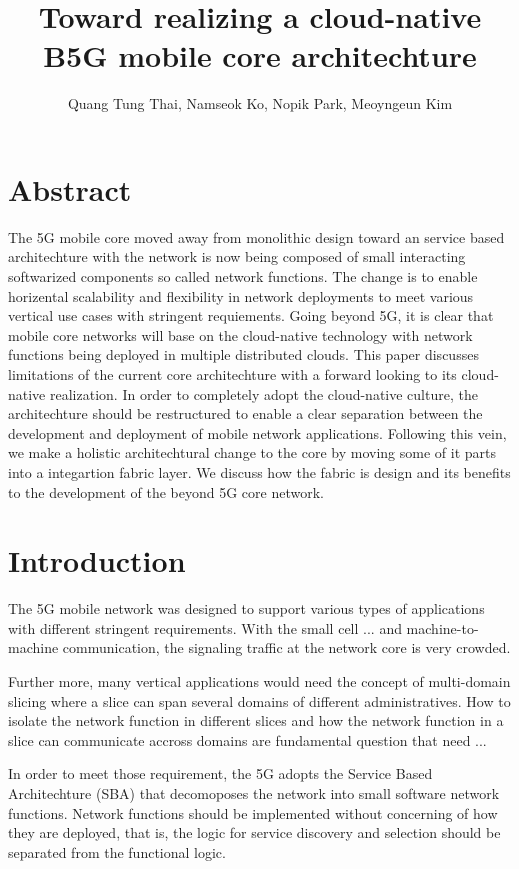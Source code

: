\documentclass[a4paper]{article}
\author{Quang Tung Thai, Namseok Ko, Nopik Park, Meoyngeun Kim}
\title{Toward realizing a cloud-native B5G mobile core architechture}
\begin{document}
\maketitle

\section{Abstract}

The 5G mobile core moved away from monolithic design toward an service based architechture with the network is now being composed of small interacting softwarized components so called network functions. The change is to enable horizental scalability and flexibility in network deployments to meet various vertical use cases with stringent requiements. Going beyond 5G, it is clear that mobile core networks will base on the cloud-native technology with network functions being deployed in multiple distributed clouds. This paper discusses limitations of the current core architechture with a forward looking to its cloud-native realization. In order to completely adopt the cloud-native culture, the architechture should be restructured to enable a clear separation between the development and deployment of mobile network applications.  Following this vein, we make a holistic architechtural change to the core by moving some of it parts into a integartion fabric layer. We discuss how the fabric is design and its benefits to the development of the beyond 5G core network.



\section{Introduction}

The 5G mobile network was designed to support various types of applications with different stringent requirements.  With the small cell ... and machine-to-machine communication, the signaling traffic at the network core is very crowded. 

Further more, many vertical applications would need the concept of multi-domain slicing where a slice can span several domains of different administratives. How to isolate the network function in different slices and how the network function in a slice can communicate accross domains are fundamental question that need ...

In order to meet those requirement, the 5G adopts the Service Based Architechture (SBA) that decomoposes the network into small software network functions. 
Network functions should be implemented without concerning of how they are deployed, that is, the logic for service discovery and selection should be separated from the functional logic.
\end{document}
